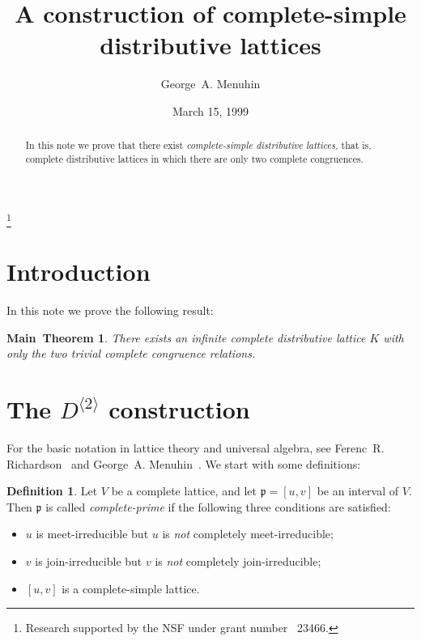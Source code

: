 \documentclass{amsart}
\theoremstyle{plain}
\newtheorem*{main}{Main~Theorem}
\theoremstyle{definition}
\newtheorem{definition}{Definition}
\theoremstyle{remark}
\numberwithin{equation}{section}
\begin{document}
\title[Complete-simple distributive lattices]
      {A construction of complete-simple\\  
       distributive lattices}
\author{George~A. Menuhin}
\address{Computer Science Department\\
         University of Winnebago\\
         Winnebago, Minnesota 53714} 
\thanks{Research supported by the NSF under grant number
~23466.}  
\date{March 15, 1999}
\begin{abstract}
   In this note we prove that there exist \emph{complete-simple distributive
   lattices,} that is, complete distributive lattices in which there are 
   only two complete congruences. 
\end{abstract}

\maketitle

\section{Introduction}\label{S:intro} 
In this note we prove the following result:

\begin{main} 
   There exists an infinite complete distributive lattice $K$ with only 
   the two trivial complete congruence relations.
\end{main}

\section{The $D^{\langle 2 \rangle}$ construction}\label{S:Ds} 
For the basic notation in lattice theory and universal algebra, see Ferenc~R.
Richardson~\cite{fR82} and George~A. Menuhin~\cite{gM68}.  We start with some
definitions:

\begin{definition}\label{D:prime}
   Let $V$ be a complete lattice, and let $\mathfrak{p} = [u, v]$ be
   an interval of $V$.  Then $\mathfrak{p}$ is called 
   \emph{complete-prime} if the following three conditions are satisfied:
   \begin{itemize}
      \item[(1)] $u$ is meet-irreducible but $u$ is \emph{not}
         completely meet-irreducible;
      \item[(2)] $v$ is join-irreducible but $v$ is \emph{not} 
         completely join-irreducible;
      \item[(3)] $[u, v]$ is a complete-simple lattice.
   \end{itemize}
\end{definition}
\end{document}
